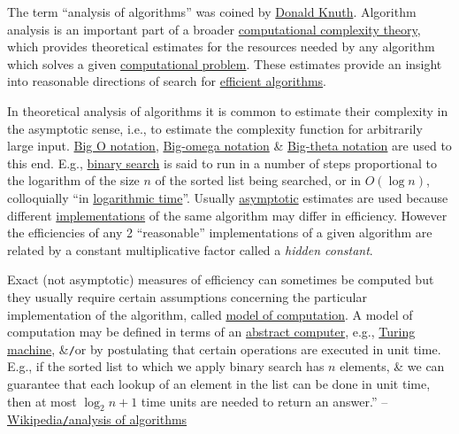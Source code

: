 \documentclass{article}
\begin{document}
The term ``analysis of algorithms'' was coined by \href{https://en.wikipedia.org/wiki/Donald_Knuth}{Donald Knuth}. Algorithm analysis is an important part of a broader \href{https://en.wikipedia.org/wiki/Computational_complexity_theory}{computational complexity theory}, which provides theoretical estimates for the resources needed by any algorithm which solves a given \href{https://en.wikipedia.org/wiki/Computational_problem}{computational problem}. These estimates provide an insight into reasonable directions of search for \href{https://en.wikipedia.org/wiki/Algorithmic_efficiency}{efficient algorithms}.

In theoretical analysis of algorithms it is common to estimate their complexity in the asymptotic sense, i.e., to estimate the complexity function for arbitrarily large input. \href{https://en.wikipedia.org/wiki/Big_O_notation}{Big O notation}, \href{https://en.wikipedia.org/wiki/Big-omega_notation}{Big-omega notation} \& \href{https://en.wikipedia.org/wiki/Big-theta_notation}{Big-theta notation} are used to this end. E.g., \href{https://en.wikipedia.org/wiki/Binary_search}{binary search} is said to run in a number of steps proportional to the logarithm of the size $n$ of the sorted list being searched, or in $O(\log n)$, colloquially ``in \href{https://en.wikipedia.org/wiki/Logarithmic_time}{logarithmic time}''. Usually \href{https://en.wikipedia.org/wiki/Asymptotic_analysis}{asymptotic} estimates are used because different \href{https://en.wikipedia.org/wiki/Implementation}{implementations} of the same algorithm may differ in efficiency. However the efficiencies of any 2 ``reasonable'' implementations of a given algorithm are related by a constant multiplicative factor called a \textit{hidden constant}.

Exact (not asymptotic) measures of efficiency can sometimes be computed but they usually require certain assumptions concerning the particular implementation of the algorithm, called \href{https://en.wikipedia.org/wiki/Model_of_computation}{model of computation}. A model of computation may be defined in terms of an \href{https://en.wikipedia.org/wiki/Abstract_machine}{abstract computer}, e.g., \href{https://en.wikipedia.org/wiki/Turing_machine}{Turing machine}, \&\texttt{/}or by postulating that certain operations are executed in unit time. E.g., if the sorted list to which we apply binary search has $n$ elements, \& we can guarantee that each lookup of an element in the list can be done in unit time, then at most $\log_2n + 1$ time units are needed to return an answer.'' -- \href{https://en.wikipedia.org/wiki/Analysis_of_algorithms}{Wikipedia\texttt{/}analysis of algorithms}
\end{document}

